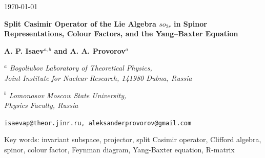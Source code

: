 \documentclass[a4paper]{article}
\newcommand{\Spin}{\mathrm{Spin}}
\renewcommand{\=}{\ =\ }
\numberwithin{equation}{section}
\theoremstyle{remark}
\begin{document}
\begin{flushright}
\today \\
\end{flushright}
\vspace{2.3cm}

\begin{center}
{\huge\bf Split Casimir Operator of the Lie Algebra $so_{2r}$ in Spinor Representations, Colour Factors, and the Yang–Baxter Equation}
\end{center}
\vspace{1cm}

\begin{center}
{\Large \bf A. P. Isaev${}^{a,b}$ and A. A. Provorov${}^{a}$}
\end{center}

\vspace{0.2cm}

\begin{center}
{${}^a$ \it
Bogoliubov  Laboratory of Theoretical Physics,\\
Joint Institute for Nuclear Research,
141980 Dubna, Russia}\vspace{0.1cm}

{${}^b$ \it Lomonosov Moscow State University, \\
 Physics Faculty, Russia}\vspace{0.1cm}

{\tt isaevap@theor.jinr.ru, aleksanderprovorov@gmail.com}
\end{center}
\vspace{3cm}


\begin{abstract}
In this paper, we derive characteristic identities for the split Casimir operator of the Lie algebra $so_{2r}$ in tensor products of spinor representations of the same and opposite chiralities. Using these identities, we explicitly construct projectors onto invariant subspaces of this operator and compute their traces. The results obtained allow us to derive explicit expressions for the colour factors of ladder Feynman diagrams in gauge theories with gauge group $\Spin(2r)$.In addition, we obtain a new form of a solution to the Yang–Baxter equation that is invariant under the action of the Lie algebra $so_{2r}$ in spinor representations.
\end{abstract}

\vspace{1cm}
Key words: invariant subspace, projector, split Casimir operator, Clifford algebra, spinor, colour factor, Feynman diagram, Yang-Baxter equation, R-matrix
\end{document}
